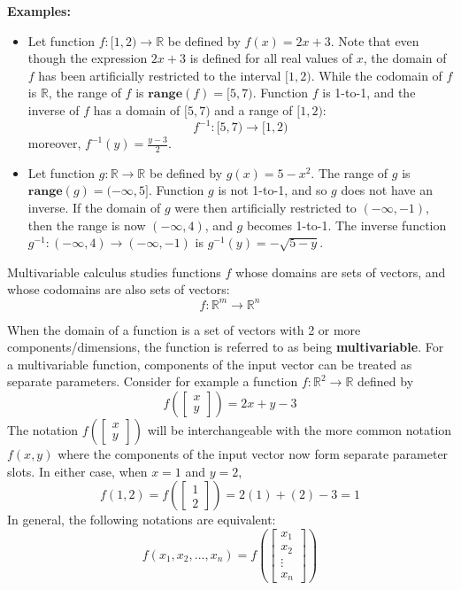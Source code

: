 \documentclass{article}
\begin{document}
\textbf{Examples:}
\begin{itemize}
\item Let function \(f: [1, 2) \rightarrow \mathbb{R}\) be defined by \(f(x) = 2x + 3\). Note that even though the expression \(2x + 3\) is defined for all real values of \(x\), the domain of \(f\) has been artificially restricted to the interval \([1, 2)\). While the codomain of \(f\) is \(\mathbb{R}\), the range of \(f\) is \(\textbf{range}(f) = [5, 7)\). Function \(f\) is 1-to-1, and the inverse of \(f\) has a domain of \([5, 7)\) and a range of \([1, 2)\):
\[f^{-1} : [5, 7) \rightarrow [1, 2)\]  
moreover, \(f^{-1}(y) = \frac{y - 3}{2}\).
\item Let function \(g: \mathbb{R} \rightarrow \mathbb{R}\) be defined by \(g(x) = 5 - x^2\). The range of \(g\) is \(\textbf{range}(g) = (-\infty, 5]\). Function \(g\) is not 1-to-1, and so \(g\) does not have an inverse. If the domain of \(g\) were then artificially restricted to \((-\infty, -1)\), then the range is now \((-\infty, 4)\), and \(g\) becomes 1-to-1. The inverse function \(g^{-1} : (-\infty, 4) \rightarrow (-\infty, -1)\) is \(g^{-1}(y) = -\sqrt{5 - y}\).  
\end{itemize}

Multivariable calculus studies functions \(f\) whose domains are sets of vectors, and whose codomains are also sets of vectors:
\[f: \mathbb{R}^m \rightarrow \mathbb{R}^n\]   

When the domain of a function is a set of vectors with 2 or more components/dimensions, the function is referred to as being {\bf multivariable}. For a multivariable function, components of the input vector can be treated as separate parameters. Consider for example a function \(f: \mathbb{R}^2 \rightarrow \mathbb{R}\) defined by 
\[f\left(\begin{bmatrix} x \\ y \end{bmatrix}\right) = 2x + y - 3\] 
The notation \(f\left(\begin{bmatrix} x \\ y \end{bmatrix}\right)\) will be interchangeable with the more common notation \(f(x, y)\) where the components of the input vector now form separate parameter slots. In either case, when \(x = 1\) and \(y = 2\),
\[f(1, 2) = f\left(\begin{bmatrix} 1 \\ 2 \end{bmatrix}\right) = 2(1) + (2) - 3 = 1\] 
In general, the following notations are equivalent: 
\[f(x_1, x_2, ..., x_n) = f\left(\begin{bmatrix} x_1 \\ x_2 \\ \vdots \\ x_n \end{bmatrix}\right)\]
\end{document}
